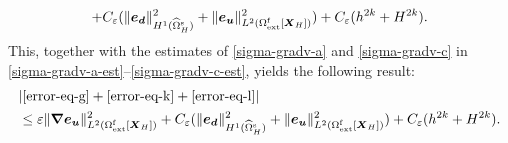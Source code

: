 \documentclass[11pt,reqno]{amsart}
\theoremstyle{definition}
\theoremstyle{plain}
\numberwithin{theorem}{section}
\numberwithin{proposition}{section}
\numberwithin{lemma}{section}
\numberwithin{equation}{section}
\newcommand{\bs}[1]{\boldsymbol{#1}}
\newcommand{\uu}[1]  {{\bs{#1}} }
\newcommand{\dep}{{{\bs{d}}}}
\newcommand{\grad}   { \uu{\nabla}    }
\renewcommand{\(}{\bigl(}
\renewcommand{\)}{\bigr)}
\begin{document}
\begin{itemize}[leftmargin=20pt]
\begin{align*}
+ C_{\varepsilon} (\|{\bs e}_\dep\|_{H^1(\widehat{\Omega}^{\rm s}_H)}^2+ \|{\bs e}_{\bs u} \|_{L^2(\Omega^{\rm f}_{\rm ext}[{\bs X}_H])}^2 ) + C_{\varepsilon} (h^{2k}+H^{2k}) .
\end{align*}
This, together with the estimates of \eqref{sigma-gradv-a} and \eqref{sigma-gradv-c} in \eqref{sigma-gradv-a-est}--\eqref{sigma-gradv-c-est}, yields the following result: 
\begin{align*}
& | \eqref{error-eq-g} + \eqref{error-eq-k} + \eqref{error-eq-l} | \notag\\ 
&\le 
\varepsilon\|\grad {\bs e}_{\bs u}\|_{L^2(\Omega^{\rm f}_{\rm ext}[{\bs X}_H])}^2 
+ C_{\varepsilon} (\|{\bs e}_\dep\|_{H^1(\widehat{\Omega}^{\rm s}_H)}^2+ \|{\bs e}_{\bs u} \|_{L^2(\Omega^{\rm f}_{\rm ext}[{\bs X}_H])}^2 ) 
+ C_{\varepsilon} (h^{2k}+H^{2k}) .
\end{align*}


\end{itemize}
\end{document}
